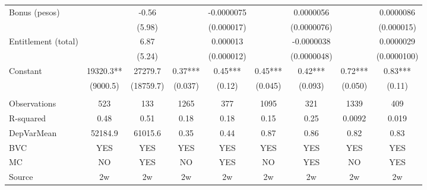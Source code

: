 \begin{tabular}{lcccccccc}
Bonus (pesos) &       & -0.56 &       & -0.0000075 &       & 0.0000056 &       & 0.0000086 \\
      &       & (5.98) &       & (0.000017) &       & (0.0000076) &       & (0.000015) \\
Entitlement (total) &       & 6.87  &       & 0.000013 &       & -0.0000038 &       & 0.0000029 \\
      &       & (5.24) &       & (0.000012) &       & (0.0000048) &       & (0.0000100) \\
Constant & 19320.3** & 27279.7 & 0.37*** & 0.45*** & 0.45*** & 0.42*** & 0.72*** & 0.83*** \\
      & (9000.5) & (18759.7) & (0.037) & (0.12) & (0.045) & (0.093) & (0.050) & (0.11) \\
      &       &       &       &       &       &       &       &  \\
\midrule
Observations & 523   & 133   & 1265  & 377   & 1095  & 321   & 1339  & 409 \\
R-squared & 0.48  & 0.51  & 0.18  & 0.18  & 0.15  & 0.25  & 0.0092 & 0.019 \\
DepVarMean & 52184.9 & 61015.6 & 0.35  & 0.44  & 0.87  & 0.86  & 0.82  & 0.83 \\
BVC   & YES   & YES   & YES   & YES   & YES   & YES   & YES   & YES \\
MC    & NO    & YES   & NO    & YES   & NO    & YES   & NO    & YES \\
Source & 2w    & 2w    & 2w    & 2w    & 2w    & 2w    & 2w    & 2w \\
\bottomrule
\bottomrule
\end{tabular}%
